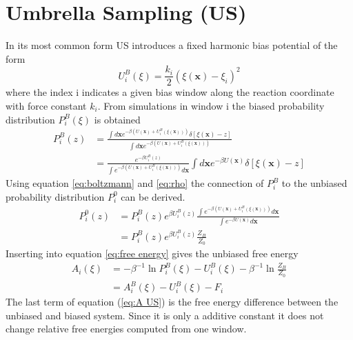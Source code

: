 \section{Umbrella Sampling (US)}
In its most common form US introduces a fixed harmonic bias potential of the form
\begin{equation}
  U_i^B(\xi) = \frac{k_i}{2}(\xi(\textbf{x})-\xi_i)^2 \label{eq:US bias}
\end{equation}
where the index i indicates a given bias window along the reaction coordinate with force constant $k_i$.\autocite{kastner2011umbrella} From simulations in window i the biased probability distribution $P_i^B(\xi)$ is obtained
\begin{equation}
\begin{split}
  P_i^B(z) &= \frac{\int d\textbf{x} e^{-\beta (U(\textbf{x})+U_i^B(\xi(\textbf{x})))}\delta[\xi(\textbf{x})-z]}
  {\int d\textbf{x} e^{-\beta (U(\textbf{x})+U_i^B(\xi(\textbf{x})))}} \\
             &= \frac{e^{-\beta U_i^B(z)}}{\int e^{-\beta (U(\textbf{x})+U_i^B(\xi(\textbf{x})))}d\textbf{x}} \int d\textbf{x} e^{-\beta U(\textbf{x})}\delta[\xi(\textbf{x})-z]
\end{split}
\end{equation}
Using equation \ref{eq:boltzmann} and \ref{eq:rho} the connection of $P_i^B$ to the unbiased probability distribution $P_i^0$ can be derived.
\begin{equation}
\begin{split}
  P_i^0(z) &= P_i^B(z)e^{\beta U_i^B(z)}\frac{\int e^{-\beta (U(\textbf{x})+U_i^B(\xi(\textbf{x})))}d\textbf{x}} {\int e^{-\beta U(\textbf{x})}d\textbf{x}} \\
  &= P_i^B(z)e^{\beta U_i^B(z)}\frac{Z_B}{Z_0}
\end{split}
\end{equation}
Inserting into equation \ref{eq:free energy} gives the unbiased free energy
\begin{equation}
  \begin{split}
  A_i(\xi) &= -\beta^{-1}\ln P_i^B(\xi) - U_i^B(\xi) - \beta^{-1}\ln\frac{Z_B}{Z_0} \\
           &= A_i^B(\xi) - U_i^B(\xi) - F_i \label{eq:A US}
  \end{split}
\end{equation}
The last term of equation (\ref{eq:A US}) is the free energy difference between the unbiased and biased system.
Since it is only a additive constant it does not change relative free energies computed from one window.
